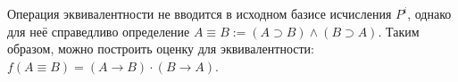 \begin{remark}
    Операция эквивалентности не вводится в исходном базисе исчисления $P^i$, однако для неё справедливо определение $A \equiv B := (A \supset B) \land (B \supset A)$. Таким образом, можно построить оценку для эквивалентности: $f(A \equiv B) = (A \to B) \cdot (B \to A)$.
\end{remark}

